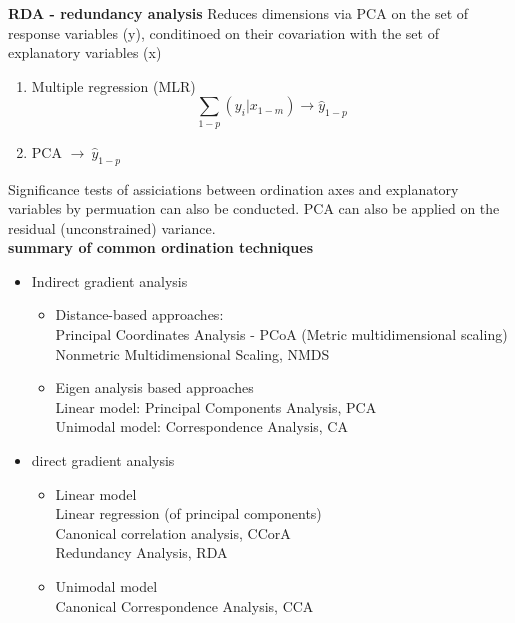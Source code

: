 \documentclass{article}
\begin{document}
\newpage 
\textbf{RDA - redundancy analysis}
Reduces dimensions via PCA on the set of response variables (y), conditinoed on their covariation with the set of explanatory variables (x)
\begin{enumerate}
    \item Multiple regression (MLR) $$\sum_{1-p} (y_i | x_{1-m}) \rightarrow \hat{y}_{1-p}$$
    \item PCA $\rightarrow \: \hat{y}_{1-p}$
\end{enumerate}
Significance tests of assiciations between ordination axes and explanatory variables by permuation can also be conducted. PCA can also be applied on the residual (unconstrained) variance.\\
\textbf{summary of common ordination techniques}
\begin{itemize}
    \item Indirect gradient analysis
    \begin{itemize}
        \item Distance-based approaches: \\
			Principal Coordinates Analysis - PCoA (Metric multidimensional scaling) \\
			Nonmetric Multidimensional Scaling, NMDS
		\item Eigen analysis based approaches\\
			Linear model: Principal Components Analysis, PCA \\
			Unimodal model: Correspondence Analysis, CA
    \end{itemize}
    \item direct gradient analysis
    \begin{itemize}
        \item Linear model\\
			Linear regression (of principal components) \\
			Canonical correlation analysis, CCorA \\
			Redundancy Analysis, RDA
		\item Unimodal model \\
			Canonical Correspondence Analysis, CCA
    \end{itemize}
\end{itemize}
\end{document}
